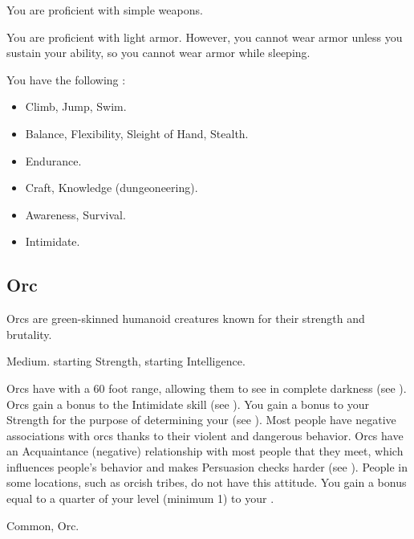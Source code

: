             You are proficient with simple weapons.

            You are proficient with light armor.
            However, you cannot wear armor unless you sustain your  ability, so you cannot wear armor while sleeping.

            You have the following :
            \begin{itemize}
                \item {} Climb, Jump, Swim.
                \item {} Balance, Flexibility, Sleight of Hand, Stealth.
                \item {} Endurance.
                \item {} Craft, Knowledge (dungeoneering).
                \item {} Awareness, Survival.
                \item {} Intimidate.
            \end{itemize}

    \subsection{Orc}
        Orcs are green-skinned humanoid creatures known for their strength and brutality.

         Medium.
          starting Strength,  starting Intelligence.
        \begin{itemize}
             Orcs have  with a 60 foot range, allowing them to see in complete darkness (see ).
             Orcs gain a  bonus to the Intimidate skill (see ).
             You gain a  bonus to your Strength for the purpose of determining your  (see ).
             Most people have negative associations with orcs thanks to their violent and dangerous behavior.
                Orcs have an Acquaintance (negative) relationship with most people that they meet, which influences people's behavior and makes Persuasion checks harder (see ).
                People in some locations, such as orcish tribes, do not have this attitude.
             You gain a bonus equal to a quarter of your level (minimum 1) to your .
        \end{itemize}
         Common, Orc.

